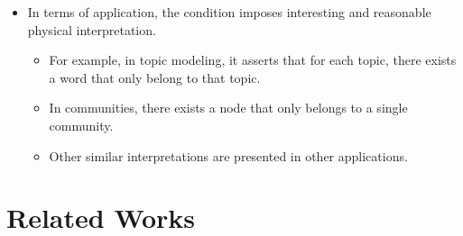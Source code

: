 \documentclass[10pt,xcolor={usenames,dvipsnames,table}]{beamer}
\begin{document}
\begin{frame}
{\begin{itemize}
    This notation means a sub-matrix constructed by from columns of $\bm{X}$ with indices from $\mathcal{K}$. Therefore, knowing $\mathcal{K}$ already reveals $\bm{W}$. Then finding $\bm{H}$ becomes a trivial task.

    \item In terms of application, the condition imposes interesting and reasonable physical interpretation.
        \begin{itemize}
            \item For example, in topic modeling, it asserts that for each topic, there exists a word that only belong to that topic. 
            \item In communities, there exists a node that only belongs to a single community. 
            \item Other similar interpretations are presented in other applications.
        \end{itemize}
\end{itemize}
}
\end{frame}

\section{Related Works}%
\label{sec:what_have_people_done_}
\end{document}
